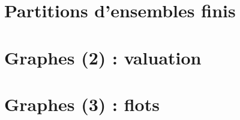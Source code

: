 \documentclass{minitelreport}
\begin{document}
\begin{refsection}
		\section{Partitions d'ensembles finis}
			\label{sec:partitions}
			
		\newpage
		\section{Graphes (2) : valuation}
			\label{sec:graphes_values}
			
		\newpage
		\section{Graphes (3) : flots}
			\label{sec:graphes_et_flots}
			

\end{refsection}
\end{document}
